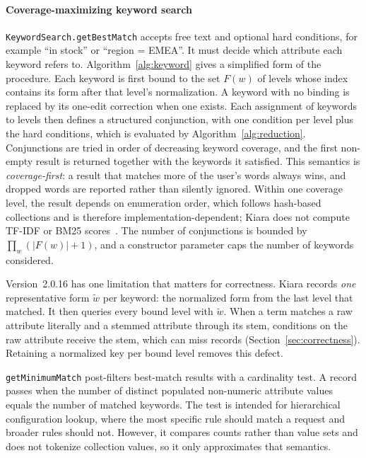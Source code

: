 \paragraph*{Coverage-maximizing keyword search}
\texttt{KeywordSearch.getBestMatch} accepts free text and optional hard conditions, for example ``in stock'' or ``region = EMEA''. It must decide which attribute each keyword refers to. Algorithm~\ref{alg:keyword} gives a simplified form of the procedure. Each keyword is first bound to the set $F(w)$ of levels whose index contains its form after that level's normalization. A keyword with no binding is replaced by its one-edit correction when one exists. Each assignment of keywords to levels then defines a structured conjunction, with one  condition per level plus the hard conditions, which is evaluated by Algorithm~\ref{alg:reduction}. Conjunctions are tried in order of decreasing keyword coverage, and the first non-empty result is returned together with the keywords it satisfied. This semantics is \emph{coverage-first}: a result that matches more of the user's words always wins, and dropped words are reported rather than silently ignored. Within one coverage level, the result depends on enumeration order, which follows hash-based collections and is therefore implementation-dependent; Kiara does not compute TF-IDF or BM25 scores~\cite{robertson2009bm25}. The number of conjunctions is bounded by $\prod_{w}(|F(w)|+1)$, and a constructor parameter caps the number of keywords considered.

Version~2.0.16 has one limitation that matters for correctness. Kiara records \emph{one} representative form $\tilde w$ per keyword: the normalized form from the last level that matched. It then queries every bound level with $\tilde w$. When a term matches a raw attribute literally and a stemmed attribute through its stem, conditions on the raw attribute receive the stem, which can miss records (Section~\ref{sec:correctness}). Retaining a normalized key per bound level removes this defect.

\texttt{getMinimumMatch} post-filters best-match results with a cardinality test. A record passes when the number of distinct populated non-numeric attribute values equals the number of matched keywords. The test is intended for hierarchical configuration lookup, where the most specific rule should match a request and broader rules should not. However, it compares counts rather than value sets and does not tokenize collection values, so it only approximates that semantics.

